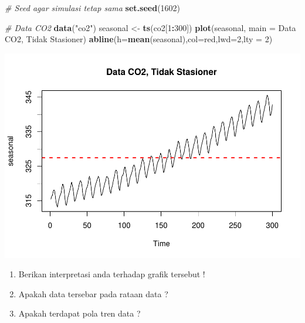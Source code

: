 \documentclass[
]{book}
\newenvironment{Shaded}{\begin{snugshade}}{\end{snugshade}}
\newcommand{\AttributeTok}[1]{\textcolor[rgb]{0.13,0.29,0.53}{#1}}
\newcommand{\CommentTok}[1]{\textcolor[rgb]{0.56,0.35,0.01}{\textit{#1}}}
\newcommand{\DecValTok}[1]{\textcolor[rgb]{0.00,0.00,0.81}{#1}}
\newcommand{\FunctionTok}[1]{\textcolor[rgb]{0.13,0.29,0.53}{\textbf{#1}}}
\newcommand{\NormalTok}[1]{#1}
\newcommand{\OtherTok}[1]{\textcolor[rgb]{0.56,0.35,0.01}{#1}}
\newcommand{\SpecialCharTok}[1]{\textcolor[rgb]{0.81,0.36,0.00}{\textbf{#1}}}
\newcommand{\StringTok}[1]{\textcolor[rgb]{0.31,0.60,0.02}{#1}}
\begin{document}
\begin{Shaded}
\begin{Highlighting}[]
\CommentTok{\# Seed agar simulasi tetap sama}
\FunctionTok{set.seed}\NormalTok{(}\DecValTok{1602}\NormalTok{)}

\CommentTok{\# Data CO2}
\FunctionTok{data}\NormalTok{(}\StringTok{"co2"}\NormalTok{)}
\NormalTok{seasonal }\OtherTok{\textless{}{-}} \FunctionTok{ts}\NormalTok{(co2[}\DecValTok{1}\SpecialCharTok{:}\DecValTok{300}\NormalTok{])}
\FunctionTok{plot}\NormalTok{(seasonal, }\AttributeTok{main =} \StringTok{\textquotesingle{}Data CO2, Tidak Stasioner\textquotesingle{}}\NormalTok{)}
\FunctionTok{abline}\NormalTok{(}\AttributeTok{h=}\FunctionTok{mean}\NormalTok{(seasonal),}\AttributeTok{col=}\StringTok{\textquotesingle{}red\textquotesingle{}}\NormalTok{,}\AttributeTok{lwd=}\DecValTok{2}\NormalTok{,}\AttributeTok{lty =} \DecValTok{2}\NormalTok{)}
\end{Highlighting}
\end{Shaded}

\begin{center}\includegraphics{_main_files/figure-latex/Contoh Plot yang Stasioner daan Tidak Stasioner-1} \end{center}
\begin{jp}{}{}
\begin{enumerate}
\item Berikan interpretasi anda terhadap grafik tersebut !  
\item Apakah data tersebar pada rataan data ?  
\item Apakah terdapat pola tren data ?
\end{enumerate}
\end{jp}
\end{document}
